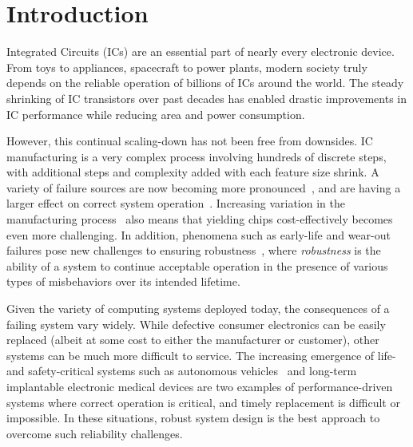 \chapter{Introduction}
\label{chap:intro}

Integrated Circuits (ICs) are an essential part of nearly every electronic device.
%
From toys to appliances, spacecraft to power plants, modern society truly depends on the reliable operation of billions of ICs around the world.
%
The steady shrinking of IC transistors over past decades has enabled drastic improvements in IC performance while reducing area and power consumption.

However, this continual scaling-down has not been free from downsides.
%
IC manufacturing is a very complex process involving hundreds of discrete steps, with additional steps and complexity added with each feature size shrink.
%
A variety of failure sources are now becoming more pronounced~\cite{srinivasan04}, and are having a larger effect on correct system operation~\cite{itrspids,karnik02}.
%
Increasing variation in the manufacturing process~\cite{borkar03} also means that yielding chips cost-effectively becomes even more challenging.
%
In addition, phenomena such as early-life and wear-out failures pose new challenges to ensuring robustness~\cite{borkar03,itrspids}, where \textit{robustness} is the ability of a system to continue acceptable operation in the presence of various types of misbehaviors over its intended lifetime.

Given the variety of computing systems deployed today, the consequences of a failing system vary widely.
%
While defective consumer electronics can be easily replaced (albeit at some cost to either the manufacturer or customer), other systems can be much more difficult to service.
%
The increasing emergence of life- and safety-critical systems such as autonomous vehicles~\cite{spectrumselfdriving} and long-term implantable electronic medical devices are two examples of performance-driven systems where correct operation is critical, and timely replacement is difficult or impossible.
%
In these situations, robust system design is the best approach to overcome such reliability challenges.

